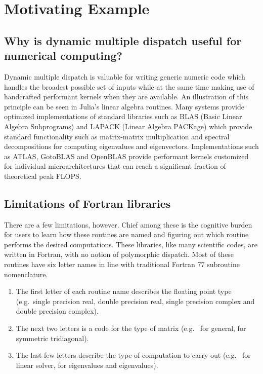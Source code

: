 \documentclass[pldi]{sigplanconf-pldi15}
\begin{document}
\section{Motivating Example}


\subsection{Why is dynamic multiple dispatch useful for numerical computing?}
Dynamic multiple dispatch is valuable for writing generic numeric code which
handles the broadest possible set of inputs while at the same time making use
of handcrafted performant kernels when they are available.  An illustration of
this principle can be seen in Julia's linear algebra routines.  Many systems
provide optimized implementations of standard libraries such as BLAS (Basic
Linear Algebra Subprograms) and LAPACK (Linear Algebra PACKage) which provide
standard functionality such as matrix-matrix multiplication and spectral
decompositions for computing eigenvalues and eigenvectors.  Implementations
such as ATLAS, GotoBLAS and OpenBLAS provide performant kernels customized for
individual microarchitectures that can reach a significant fraction of
theoretical peak FLOPS.

\subsection{Limitations of Fortran libraries}
There are a few limitations, however.  Chief among these is the cognitive
burden for users to learn how these routines are named and figuring out which
routine performs the desired computations.  These libraries, like many
scientific codes, are written in Fortran, with no notion of polymorphic
dispatch.  Most of these routines have six letter names in line with
traditional Fortran 77 subroutine nomenclature.

\begin{enumerate}
\item The first letter of each routine name describes the floating point type (e.g.\ single precision real, double precision real, single precision complex and double precision complex).

\item The next two letters is a code for the type of matrix (e.g.\  for general,  for symmetric tridiagonal).

\item The last few letters describe the type of computation to carry out (e.g.\  for linear solver,  for eigenvalues and eigenvalues).
\end{enumerate}
\end{document}

